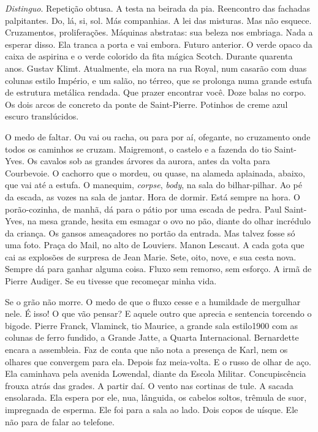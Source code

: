 \emph{Distinguo}. Repetição obtusa. A testa na beirada da pia.
Reencontro das fachadas palpitantes. Do, lá, si, sol. Más companhias. A
lei das misturas. Mas não esquece. Cruzamentos, proliferações. Máquinas
abstratas: sua beleza nos embriaga. Nada a esperar disso. Ela tranca a
porta e vai embora. Futuro anterior. O verde opaco da caixa de aspirina
e o verde colorido da fita mágica Scotch. Durante quarenta anos. Gustav
Klimt. Atualmente, ela mora na rua Royal, num casarão com duas colunas
estilo Império, e um salão, no térreo, que se prolonga numa grande
estufa de estrutura metálica rendada. Que prazer encontrar você. Doze
balas no corpo. Os dois arcos de concreto da ponte de Saint-Pierre.
Potinhos de creme azul escuro translúcidos.

O medo de faltar. Ou vai ou racha, ou para por aí, ofegante, no
cruzamento onde todos os caminhos se cruzam. Maigremont, o castelo e a
fazenda do tio Saint-Yves. Os cavalos sob as grandes árvores da aurora,
antes da volta para Courbevoie. O cachorro que o mordeu, ou quase, na
alameda aplainada, abaixo, que vai até a estufa. O manequim,
\emph{corpse}, \emph{body}, na sala do bilhar-pilhar. Ao pé da escada,
as vozes na sala de jantar. Hora de dormir. Está sempre na hora. O
porão-cozinha, de manhã, dá para o pátio por uma escada de pedra. Paul
Saint-Yves, na mesa grande, hesita em esmagar o ovo no pão, diante do
olhar incrédulo da criança. Os gansos ameaçadores no portão da entrada.
Mas talvez fosse só uma foto. Praça do Mail, no alto de Louviers. Manon
Lescaut. A cada gota que cai as explosões de surpresa de Jean Marie.
Sete, oito, nove, e sua cesta nova. Sempre dá para ganhar alguma coisa.
Fluxo sem remorso, sem esforço. A irmã de Pierre Audiger. Se eu tivesse
que recomeçar minha vida.

Se o grão não morre. O medo de que o fluxo cesse e a humildade de
mergulhar nele. É isso! O que vão pensar? E aquele outro que aprecia e
sentencia torcendo o bigode. Pierre Franck, Vlaminck, tio Maurice, a
grande sala estilo1900 com as colunas de ferro fundido, a Grande Jatte,
a Quarta Internacional. Bernardette encara a assembleia. Faz de conta
que não nota a presença de Karl, nem os olhares que convergem para ela.
Depois faz meia-volta. E o russo de olhar de aço. Ela caminhava pela
avenida Lowendal, diante da Escola Militar. Concupiscência frouxa atrás
das grades. A partir daí. O vento nas cortinas de tule. A sacada
ensolarada. Ela espera por ele, nua, lânguida, os cabelos soltos,
trêmula de suor, impregnada de esperma. Ele foi para a sala ao lado.
Dois copos de uísque. Ele não para de falar ao telefone.


